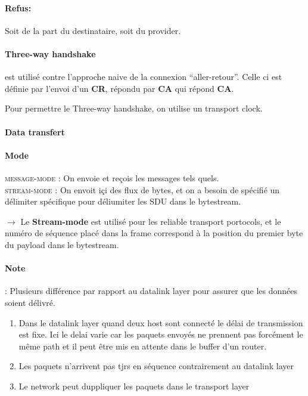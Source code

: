 \paragraph{Refus:} Soit de la part du destinataire, soit du provider.

\paragraph{Three-way handshake} est utilisé contre l'approche naive de la connexion ``aller-retour''. Celle ci est définie par l'envoi d'un \textbf{CR}, répondu par \textbf{CA} qui répond \textbf{CA}.

Pour permettre le Three-way handshake, on utilise un transport clock.


\paragraph{Data transfert}

\paragraph{Mode}
\textsc{message-mode} : On envoie et reçois les messages tels quels.\\
\textsc{stream-mode} : On envoit içi des flux de bytes, et on a besoin de spécifié un délimiter
spécifique pour déliumiter les SDU dans le bytestream.

$\rightarrow$  Le \textbf{Stream-mode}  est utilisé  pour les  reliable
transport portocols,  et le  numéro de séquence  placé dans  la frame
correspond à la position du premier byte du payload dans le bytestream.

\paragraph{Note} : Plusieurs différence par rapport au datalink layer pour assurer que les
données soient délivré.

\begin{enumerate}
    \item Dans  le datalink  layer quand  deux host  sont
connecté le délai de transmission est fixe. Ici le delai varie car les
paquets envoyés  ne prennent pas  forcément le  même path et  il peut
être mis en attente dans le buffer d'un router.
    \item Les paquets n'arrivent pas tjrs en séquence contrairement au datalink layer
    \item Le network peut duppliquer les paquets dans le transport layer
\end{enumerate}

